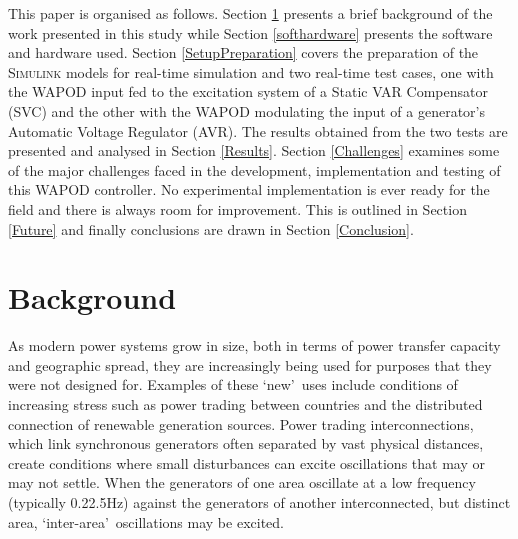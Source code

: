 \documentclass[journal]{IEEEtran}
\begin{document}
This paper is organised as follows. Section \ref{Background} presents a brief background of the work presented in this study while Section \ref{softhardware} presents the software and hardware used. Section \ref{SetupPreparation} covers the preparation of the \textsc{Simulink} models for real-time simulation and two real-time test cases, one with the WAPOD input fed to the excitation system of a Static VAR Compensator (SVC) and the other with the WAPOD modulating the input of a generator\rq{s} Automatic Voltage Regulator (AVR). The results obtained from the two tests are presented and analysed in Section \ref{Results}. Section \ref{Challenges} examines some of the major challenges faced in the development, implementation and testing of this WAPOD controller. No experimental implementation is ever ready for the field and there is always room for improvement. This is outlined in Section \ref{Future} and finally conclusions are drawn in Section \ref{Conclusion}.
\section{Background}\label{Background}
As modern power systems grow in size, both in terms of power transfer capacity and geographic spread, they are increasingly being used for purposes that they were not designed for. Examples of these \textquoteleft new\textquoteright ~uses include conditions of increasing stress such as power trading between countries and the distributed connection of renewable generation sources. Power trading interconnections, which link synchronous generators often separated by vast physical distances, create conditions where small disturbances can excite oscillations that may or may not settle. When the generators of one area oscillate at a low frequency (typically 0.2\textendash 2.5Hz) against the generators of another interconnected, but distinct area, \textquoteleft inter-area\textquoteright ~oscillations may be excited.
\end{document}
